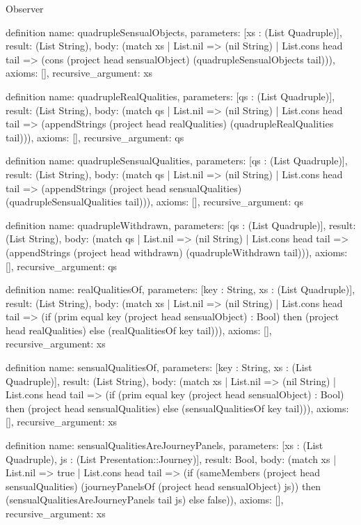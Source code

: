 \begin{lexlean}{Observer}
\begin{semanticmodule}
definition{
  name: quadrupleSensualObjects,
  parameters: [xs : (List Quadruple)],
  result: (List String),
  body: (match xs
    | List.nil => (nil String)
    | List.cons head tail => (cons (project head sensualObject) (quadrupleSensualObjects tail))),
  axioms: [],
  recursive_argument: xs
}

definition{
  name: quadrupleRealQualities,
  parameters: [qs : (List Quadruple)],
  result: (List String),
  body: (match qs
    | List.nil => (nil String)
    | List.cons head tail => (appendStrings (project head realQualities) (quadrupleRealQualities tail))),
  axioms: [],
  recursive_argument: qs
}

definition{
  name: quadrupleSensualQualities,
  parameters: [qs : (List Quadruple)],
  result: (List String),
  body: (match qs
    | List.nil => (nil String)
    | List.cons head tail => (appendStrings (project head sensualQualities) (quadrupleSensualQualities tail))),
  axioms: [],
  recursive_argument: qs
}

definition{
  name: quadrupleWithdrawn,
  parameters: [qs : (List Quadruple)],
  result: (List String),
  body: (match qs
    | List.nil => (nil String)
    | List.cons head tail => (appendStrings (project head withdrawn) (quadrupleWithdrawn tail))),
  axioms: [],
  recursive_argument: qs
}

definition{
  name: realQualitiesOf,
  parameters: [key : String, xs : (List Quadruple)],
  result: (List String),
  body: (match xs
    | List.nil => (nil String)
    | List.cons head tail => (if (prim equal key (project head sensualObject) : Bool) then (project head realQualities) else (realQualitiesOf key tail))),
  axioms: [],
  recursive_argument: xs
}

definition{
  name: sensualQualitiesOf,
  parameters: [key : String, xs : (List Quadruple)],
  result: (List String),
  body: (match xs
    | List.nil => (nil String)
    | List.cons head tail => (if (prim equal key (project head sensualObject) : Bool) then (project head sensualQualities) else (sensualQualitiesOf key tail))),
  axioms: [],
  recursive_argument: xs
}

definition{
  name: sensualQualitiesAreJourneyPanels,
  parameters: [xs : (List Quadruple), js : (List Presentation::Journey)],
  result: Bool,
  body: (match xs
    | List.nil => true
    | List.cons head tail => (if (sameMembers (project head sensualQualities) (journeyPanelsOf (project head sensualObject) js)) then (sensualQualitiesAreJourneyPanels tail js) else false)),
  axioms: [],
  recursive_argument: xs
}


\end{semanticmodule}
\end{lexlean}
